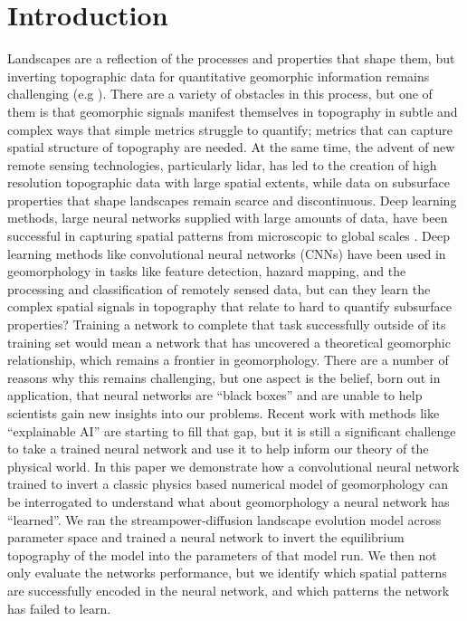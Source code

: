\documentclass[draft]{agujournal2019}
\begin{document}
\section{Introduction}
\label{sec:org5ac37b6}
Landscapes are a reflection of the processes and properties that shape them, but inverting topographic data for quantitative geomorphic information remains challenging (e.g ).  There are a variety of obstacles in this process, but one of them is that geomorphic signals manifest themselves in topography in subtle and complex ways that simple metrics struggle to quantify; metrics that can capture spatial structure of topography are needed.  At the same time, the advent of new remote sensing technologies, particularly lidar, has led to the creation of high resolution topographic data with large spatial extents, while data on subsurface properties that shape landscapes remain scarce and discontinuous.  Deep learning methods, large neural networks supplied with large amounts of data, have been successful in capturing spatial patterns from microscopic \cite{iglesiasDeepLearningDiscrimination2019} to global scales \cite{priceGenCastDiffusionbasedEnsemble2024}.  Deep learning methods like convolutional neural networks (CNNs) have been used in geomorphology in tasks like feature detection\cite{fairfaxEEAGERNeuralNetwork2023, maxwellExploringInfluenceInput2023}, hazard mapping\cite{liArtificialIntelligenceincorporatedPrediction2025}, and the processing \cite{huRSCNNCNNBasedMethod2020} and classification\cite{maxwellExploringInfluenceInput2023} of remotely sensed data, but can they learn the complex spatial signals in topography that relate to hard to quantify subsurface properties?  Training a network to complete that task successfully outside of its training set would mean a network that has uncovered a theoretical geomorphic relationship, which remains a frontier in geomorphology.  There are a number of reasons why this remains challenging, but one aspect is the belief, born out in application, that neural networks are ``black boxes'' and are unable to help scientists gain new insights into our problems.  Recent work with methods like ``explainable AI'' \cite{dahalExplainableArtificialIntelligence2023, youssefLandslideSusceptibilityModeling2023}are starting to fill that gap, but it is still a significant challenge to take a trained neural network and use it to help inform our theory of the physical world.  In this paper we demonstrate how a convolutional neural network trained to invert a classic physics based numerical model of geomorphology can be interrogated to understand what about geomorphology a neural network has ``learned''.  We ran the streampower-diffusion landscape evolution model across parameter space and trained a neural network to invert the equilibrium topography of the model into the parameters of that model run.  We then not only evaluate the networks performance, but we identify which spatial patterns are successfully encoded in the neural network, and which patterns the network has failed to learn.
\end{document}
